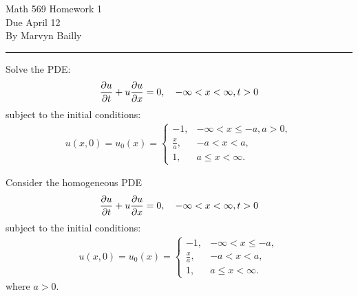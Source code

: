\documentclass[12pt]{report}
\begin{document}
\large

\begin{center}
 Math 569 Homework 1\\
 Due April 12\\
 By Marvyn Bailly\\
\end{center}

\normalsize

\hrule



\begin{problem}
    Solve the PDE:
    \begin{align*}
        \frac{\partial u}{\partial t} + u \frac{\partial u}{\partial x} = 0, ~~~ -\infty < x < \infty, t>0
    \end{align*}
    subject to the initial conditions:
    \begin{align*}
        u(x,0) = u_0(x) = \begin{cases}
            -1, &-\infty < x \leq -a, a > 0,\\
            \frac{x}{a}, &-a < x < a,\\
            1, &a \leq x < \infty.
        \end{cases}
    \end{align*}
\end{problem}

\begin{solution}
    
    \noindent
    Consider the homogeneous PDE
    \begin{align*}
        \frac{\partial u}{\partial t} + u \frac{\partial u}{\partial x} = 0, ~~~ -\infty < x < \infty, t>0
    \end{align*}
    subject to the initial conditions:
    \begin{align*}
        u(x,0) = u_0(x) = \begin{cases}
            -1, &-\infty < x \leq -a,\\
            \frac{x}{a}, &-a < x < a,\\
            1, &a \leq x < \infty.
        \end{cases}
    \end{align*}
    where $a > 0$. 



\end{solution}

\newpage
\end{document}
